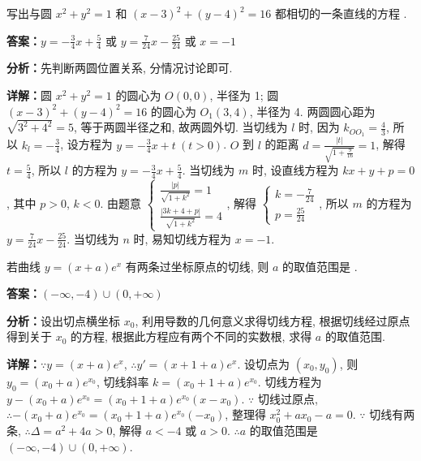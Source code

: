 \begin{question}[points=5]
写出与圆 $x^2 + y^2 = 1$ 和 $(x - 3)^2 + (y - 4)^2 = 16$ 都相切的一条直线的方程 .
\fillin[{$y = -\frac{3}{4}x + \frac{5}{4}$ 或 $y = \frac{7}{24}x - \frac{25}{24}$ 或 $x = -1$}]
\begin{solution}
\textbf{答案：}$y = -\frac{3}{4}x + \frac{5}{4}$ 或 $y = \frac{7}{24}x - \frac{25}{24}$ 或 $x = -1$

\textbf{分析：}先判断两圆位置关系, 分情况讨论即可.

\textbf{详解：}圆 $x^2 + y^2 = 1$ 的圆心为 $O(0,0)$, 半径为 1; 圆 $(x - 3)^2 + (y - 4)^2 = 16$ 的圆心为 $O_1(3,4)$, 半径为 4. 两圆圆心距为 $\sqrt{3^2 + 4^2} = 5$, 等于两圆半径之和, 故两圆外切. 当切线为 $l$ 时, 因为 $k_{OO_1} = \frac{4}{3}$, 所以 $k_l = -\frac{3}{4}$, 设方程为 $y = -\frac{3}{4}x + t\ (t > 0)$. $O$ 到 $l$ 的距离 $d = \frac{|t|}{\sqrt{1 + \frac{9}{16}}} = 1$, 解得 $t = \frac{5}{4}$, 所以 $l$ 的方程为 $y = -\frac{3}{4}x + \frac{5}{4}$. 当切线为 $m$ 时, 设直线方程为 $kx + y + p = 0$, 其中 $p > 0$, $k < 0$. 由题意 $\begin{cases} \frac{|p|}{\sqrt{1 + k^2}} = 1 \\ \frac{|3k + 4 + p|}{\sqrt{1 + k^2}} = 4 \end{cases}$, 解得 $\begin{cases} k = -\frac{7}{24} \\ p = \frac{25}{24} \end{cases}$, 所以 $m$ 的方程为 $y = \frac{7}{24}x - \frac{25}{24}$. 当切线为 $n$ 时, 易知切线方程为 $x = -1$.
\end{solution}
\end{question}

\begin{question}[points=5]
若曲线 $y = (x + a)e^x$ 有两条过坐标原点的切线, 则 $a$ 的取值范围是 .
\begin{solution}
\textbf{答案：}$(-\infty, -4) \cup (0, +\infty)$

\textbf{分析：}设出切点横坐标 $x_0$, 利用导数的几何意义求得切线方程, 根据切线经过原点得到关于 $x_0$ 的方程, 根据此方程应有两个不同的实数根, 求得 $a$ 的取值范围.

\textbf{详解：}$\because y = (x + a)e^x$, $\therefore y' = (x + 1 + a)e^x$. 设切点为 $(x_0, y_0)$, 则 $y_0 = (x_0 + a)e^{x_0}$, 切线斜率 $k = (x_0 + 1 + a)e^{x_0}$. 切线方程为 $y - (x_0 + a)e^{x_0} = (x_0 + 1 + a)e^{x_0}(x - x_0)$. $\because$ 切线过原点, $\therefore -(x_0 + a)e^{x_0} = (x_0 + 1 + a)e^{x_0}(-x_0)$, 整理得 $x_0^2 + a x_0 - a = 0$. $\because$ 切线有两条, $\therefore \Delta = a^2 + 4a > 0$, 解得 $a < -4$ 或 $a > 0$. $\therefore a$ 的取值范围是 $(-\infty, -4) \cup (0, +\infty)$.
\end{solution}
\end{question}

